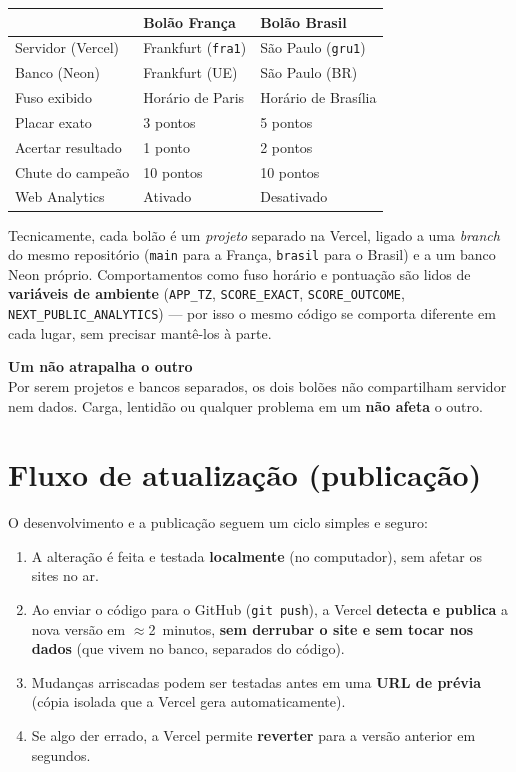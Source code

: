 \documentclass[11pt,a4paper]{article}
\newcommand{\caixa}[2]{%
  \par\medskip\noindent
  \colorbox{verdeclaro}{\begin{minipage}{\dimexpr\linewidth-2\fboxsep}
  \textbf{\color{verde}#1}\\[0.3em]#2
  \end{minipage}}\par\medskip}
\begin{document}
\begin{center}
\begin{tabularx}{\textwidth}{@{}p{3.2cm} L L@{}}
\toprule
& \textbf{Bolão França} & \textbf{Bolão Brasil} \\
\midrule
Servidor (Vercel) & Frankfurt (\texttt{fra1}) & São Paulo (\texttt{gru1}) \\
Banco (Neon) & Frankfurt (UE) & São Paulo (BR) \\
Fuso exibido & Horário de Paris & Horário de Brasília \\
Placar exato & 3 pontos & 5 pontos \\
Acertar resultado & 1 ponto & 2 pontos \\
Chute do campeão & 10 pontos & 10 pontos \\
Web Analytics & Ativado & Desativado \\
\bottomrule
\end{tabularx}
\end{center}

\noindent Tecnicamente, cada bolão é um \textit{projeto} separado na Vercel,
ligado a uma \textit{branch} do mesmo repositório (\texttt{main} para a França,
\texttt{brasil} para o Brasil) e a um banco Neon próprio. Comportamentos como
fuso horário e pontuação são lidos de \textbf{variáveis de ambiente}
(\texttt{APP\_TZ}, \texttt{SCORE\_EXACT}, \texttt{SCORE\_OUTCOME},
\texttt{NEXT\_PUBLIC\_ANALYTICS}) --- por isso o mesmo código se comporta
diferente em cada lugar, sem precisar mantê-los à parte.

\caixa{Um não atrapalha o outro}{Por serem projetos e bancos separados, os dois
bolões não compartilham servidor nem dados. Carga, lentidão ou qualquer
problema em um \textbf{não afeta} o outro.}

\section{Fluxo de atualização (publicação)}

O desenvolvimento e a publicação seguem um ciclo simples e seguro:

\begin{enumerate}
  \item A alteração é feita e testada \textbf{localmente} (no computador), sem
  afetar os sites no ar.
  \item Ao enviar o código para o GitHub (\texttt{git push}), a Vercel
  \textbf{detecta e publica} a nova versão em $\approx$2~minutos,
  \textbf{sem derrubar o site e sem tocar nos dados} (que vivem no banco,
  separados do código).
  \item Mudanças arriscadas podem ser testadas antes em uma \textbf{URL de
  prévia} (cópia isolada que a Vercel gera automaticamente).
  \item Se algo der errado, a Vercel permite \textbf{reverter} para a versão
  anterior em segundos.
\end{enumerate}
\end{document}
